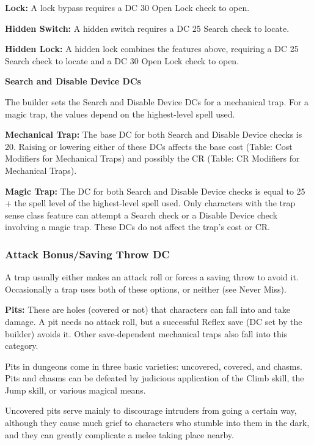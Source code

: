 \documentclass{article}
\begin{document}
\textbf{Lock:} A lock bypass requires a DC 30 Open Lock check to open. 

\textbf{Hidden Switch:} A hidden switch requires a DC 25 Search check to locate.

\textbf{Hidden Lock: }A hidden lock combines the features above, requiring a DC 
25 Search check to locate and a DC 30 Open Lock check to open.

\vspace{12pt}
\textbf{Search and Disable Device DCs}

The builder sets the Search and Disable Device DCs for a mechanical trap. For a 
magic trap, the values depend on the highest-level spell used.

\textbf{Mechanical Trap:} The base DC for both Search and Disable Device checks 
is 20. Raising or lowering either of these DCs affects the base cost (Table: Cost 
Modifiers for Mechanical Traps) and possibly the CR (Table: CR Modifiers for Mechanical 
Traps). 

\textbf{Magic Trap:} The DC for both Search and Disable Device checks is equal 
to 25 + the spell level of the highest-level spell used. Only characters with the 
trap sense class feature can attempt a Search check or a Disable Device check involving 
a magic trap. These DCs do not affect the trap's cost or CR.

\vspace{12pt}
\subsubsection*{\textbf{Attack Bonus/Saving Throw DC}}

A trap usually either makes an attack roll or forces a saving throw to avoid it. 
Occasionally a trap uses both of these options, or neither (see Never Miss).

\textbf{Pits:} These are holes (covered or not) that characters can fall into and 
take damage. A pit needs no attack roll, but a successful Reflex save (DC set by 
the builder) avoids it. Other save-dependent mechanical traps also fall into this 
category.

Pits in dungeons come in three basic varieties: uncovered, covered, and chasms. 
Pits and chasms can be defeated by judicious application of the Climb skill, the 
Jump skill, or various magical means.

Uncovered pits serve mainly to discourage intruders from going a certain way, although 
they cause much grief to characters who stumble into them in the dark, and they 
can greatly complicate a melee taking place nearby.
\end{document}
